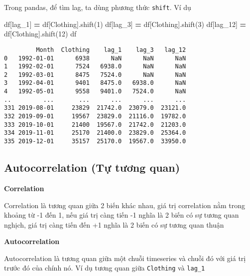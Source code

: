 \documentclass[
]{book}
\newenvironment{Shaded}{\begin{snugshade}}{\end{snugshade}}
\newcommand{\DecValTok}[1]{\textcolor[rgb]{0.00,0.00,0.81}{#1}}
\newcommand{\NormalTok}[1]{#1}
\newcommand{\OperatorTok}[1]{\textcolor[rgb]{0.81,0.36,0.00}{\textbf{#1}}}
\newcommand{\StringTok}[1]{\textcolor[rgb]{0.31,0.60,0.02}{#1}}
\begin{document}
Trong pandas, để tìm lag, ta dùng phương thức \texttt{shift}. Ví dụ

\begin{Shaded}
\begin{Highlighting}[]
\NormalTok{df[}\StringTok{\textquotesingle{}lag\_1\textquotesingle{}}\NormalTok{] }\OperatorTok{=}\NormalTok{ df[}\StringTok{\textquotesingle{}Clothing\textquotesingle{}}\NormalTok{].shift(}\DecValTok{1}\NormalTok{)}
\NormalTok{df[}\StringTok{\textquotesingle{}lag\_3\textquotesingle{}}\NormalTok{] }\OperatorTok{=}\NormalTok{ df[}\StringTok{\textquotesingle{}Clothing\textquotesingle{}}\NormalTok{].shift(}\DecValTok{3}\NormalTok{)}
\NormalTok{df[}\StringTok{\textquotesingle{}lag\_12\textquotesingle{}}\NormalTok{] }\OperatorTok{=}\NormalTok{ df[}\StringTok{\textquotesingle{}Clothing\textquotesingle{}}\NormalTok{].shift(}\DecValTok{12}\NormalTok{)}
\NormalTok{df}
\end{Highlighting}
\end{Shaded}

\begin{verbatim}
         Month  Clothing    lag_1    lag_3   lag_12
0   1992-01-01      6938      NaN      NaN      NaN
1   1992-02-01      7524   6938.0      NaN      NaN
2   1992-03-01      8475   7524.0      NaN      NaN
3   1992-04-01      9401   8475.0   6938.0      NaN
4   1992-05-01      9558   9401.0   7524.0      NaN
..         ...       ...      ...      ...      ...
331 2019-08-01     23829  21742.0  23079.0  23121.0
332 2019-09-01     19567  23829.0  21116.0  19782.0
333 2019-10-01     21400  19567.0  21742.0  21203.0
334 2019-11-01     25170  21400.0  23829.0  25364.0
335 2019-12-01     35157  25170.0  19567.0  33950.0
\end{verbatim}

\subsection{Autocorrelation (Tự tương quan)}\label{autocorrelation-tux1ef1-tux1b0ux1a1ng-quan}

\textbf{Correlation}

Correlation là tương quan giữa 2 biến khác nhau, giá trị correlation nằm trong khoảng từ -1 đến 1, nếu giá trị càng tiến -1 nghĩa là 2 biến có sự tương quan nghịch, giá trị càng tiến đến +1 nghĩa là 2 biến có sự tương quan thuận

\textbf{Autocorrelation}

Autocorrelation là tương quan giữa một chuỗi timeseries và chuỗi đó với giá trị trước đó của chính nó.
Ví dụ tương quan giữa \texttt{Clothing} và \texttt{lag\_1}
\end{document}
